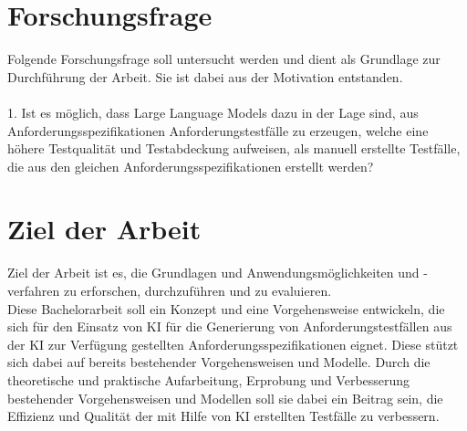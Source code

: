 \documentclass[12pt,toc=bib,toc=listof]{scrreprt}
\begin{document}

\section{Forschungsfrage} %
\label{sec:forschungsfrage}
Folgende Forschungsfrage soll untersucht werden und dient als Grundlage zur Durchführung der Arbeit. Sie ist dabei aus der Motivation entstanden.\\
\\
1. Ist es möglich, dass Large Language Models dazu in der Lage sind, aus Anforderungsspezifikationen Anforderungstestfälle zu erzeugen, welche eine höhere Testqualität und Testabdeckung aufweisen, als manuell erstellte Testfälle, die aus den gleichen Anforderungsspezifikationen erstellt werden?\\

\newpage
\noindent
\section{Ziel der Arbeit} %
\label{sec:ziel_der_arbeit}
Ziel der Arbeit ist es, die Grundlagen und Anwendungsmöglichkeiten und -verfahren zu erforschen, durchzuführen und zu evaluieren.\\
Diese Bachelorarbeit soll ein Konzept und eine Vorgehensweise entwickeln, die sich für den Einsatz von KI für die Generierung von Anforderungstestfällen aus der KI zur Verfügung gestellten Anforderungsspezifikationen eignet. Diese stützt sich dabei auf bereits bestehender Vorgehensweisen und Modelle. Durch die theoretische und praktische Aufarbeitung, Erprobung und Verbesserung bestehender Vorgehensweisen und Modellen soll sie dabei ein Beitrag sein, die Effizienz und Qualität der mit Hilfe von KI erstellten Testfälle zu verbessern.
\\

\end{document}

